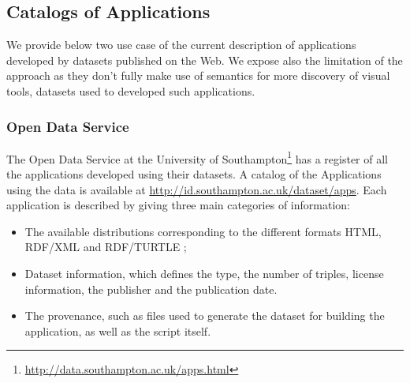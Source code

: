 \subsection{Catalogs of Applications}
We provide below two use case of the current description of applications developed by datasets published on the Web. We expose also the limitation of the approach as they don't fully make use of semantics for more discovery of visual tools, datasets used to developed such applications.

\subsubsection{Open Data Service}
The Open Data Service at the University of Southampton\footnote{\url{http://data.southampton.ac.uk/apps.html}} has a register of all the applications developed using their datasets. A catalog of the Applications using the data is available at \url{http://id.southampton.ac.uk/dataset/apps}. Each application is described by giving three main categories of information:
\begin{itemize}
\item The available distributions corresponding to the different formats HTML, RDF/XML and RDF/TURTLE ;
\item Dataset information, which defines the type, the number of triples, license information, the publisher and the publication date.
\item The provenance, such as files used to generate the dataset for building the application, as well as the script itself.
\end{itemize}

